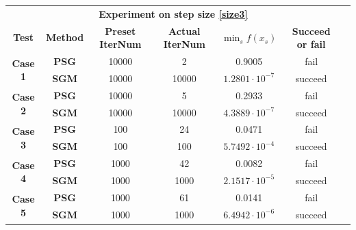 \documentclass[sn-mathphys]{JORSC-jnl}%
\theoremstyle{thmstyleone}%
\theoremstyle{thmstylethree}%
\begin{document}
\begin{table}[htbp]
\begin{adjustbox}{width=1\textwidth}
\begin{tabular}{ccccccc}
			\cmidrule[1pt]{1-7} %
			\multicolumn{6}{c}{\textbf{Experiment on step size \eqref{size3}}} & \\
			\cmidrule{1-7} %
			\textbf{Test} & \textbf{Method} & \textbf{Preset IterNum} & \textbf{Actual IterNum} & $\min_{s} f(x_s)$ & \textbf{Succeed or fail}&\\
			\midrule %
			\multirow{2}{*}{\textbf{Case 1}} & \textbf{PSG}& 10000& 2& 0.9005& fail&\\
			\cmidrule{2-7}
			& \textbf{SGM} & 10000 & 10000 & $1.2801\cdot10^{-7}$ & succeed &\\
			\midrule %
			\multirow{2}{*}{\textbf{Case 2}} & \textbf{PSG}& 10000& 5& 0.2933& fail&\\
			\cmidrule{2-7}
			& \textbf{SGM} & 10000 & 10000 & $4.3889\cdot10^{-7}$ & succeed &\\
			\midrule %
			\multirow{2}{*}{\textbf{Case 3}} & \textbf{PSG}& 100& 24& 0.0471& fail&\\
			\cmidrule{2-7}
			& \textbf{SGM} & 100 & 100 & $5.7492\cdot10^{-4}$ & succeed &\\
			\midrule %
			\multirow{2}{*}{\textbf{Case 4}} & \textbf{PSG}& 1000& 42& 0.0082& fail&\\
			\cmidrule{2-7}
			& \textbf{SGM} & 1000 & 1000 & $2.1517\cdot10^{-5}$ & succeed &\\
			\midrule %
			\multirow{2}{*}{\textbf{Case 5}} & \textbf{PSG}& 1000& 61& 0.0141& fail&\\
			\cmidrule{2-7}
			& \textbf{SGM} & 1000 & 1000 & $6.4942\cdot10^{-6}$ & succeed &\\
			\bottomrule %
		\end{tabular}
	\end{adjustbox}
	\label{tab:success_rate2}
\end{table}
\end{document}
